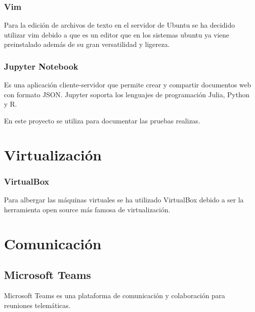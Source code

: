 \subsubsection{Vim}
Para la edición de archivos de texto en el servidor de Ubuntu se ha decidido utilizar vim debido a que es un editor que en los sistemas ubuntu ya viene preinstalado además de su gran versatilidad y ligereza.

\subsubsection{Jupyter Notebook}

Es una aplicación cliente-servidor que permite crear y compartir documentos web con formato JSON. Jupyter soporta los lenguajes de programación Julia, Python y R.

En este proyecto se utiliza para documentar las pruebas realizas.\cite{pagina:Jupyter}

\section{Virtualización}

\subsubsection{VirtualBox}
Para albergar las máquinas virtuales se ha utilizado VirtualBox debido a ser la herramienta open source más famosa de virtualización.

\begin{comment}

\section{Procesadores de lenguaje}
Herramientas consideradas: Flex, Bison, JavaCC

Debido a la baja complejidad y el poco uso que le iba a dar a esta herramienta he decidido utilizar Flex, un analizador de lenguaje open source.
\end{comment}

\section{Comunicación}
\subsection{Microsoft Teams}
Microsoft Teams es una plataforma de comunicación y colaboración para reuniones telemáticas.

